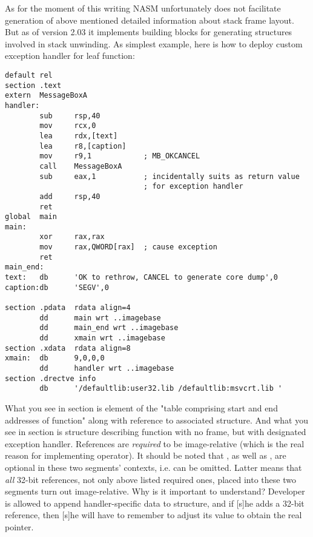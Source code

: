 As for the moment of this writing NASM unfortunately does not
facilitate generation of above mentioned detailed information about
stack frame layout. But as of version 2.03 it implements building
blocks for generating structures involved in stack unwinding. As
simplest example, here is how to deploy custom exception handler for
leaf function:

\begin{lstlisting}
default rel
section .text
extern  MessageBoxA
handler:
        sub     rsp,40
        mov     rcx,0
        lea     rdx,[text]
        lea     r8,[caption]
        mov     r9,1            ; MB_OKCANCEL
        call    MessageBoxA
        sub     eax,1           ; incidentally suits as return value
                                ; for exception handler
        add     rsp,40
        ret
global  main
main:
        xor     rax,rax
        mov     rax,QWORD[rax]  ; cause exception
        ret
main_end:
text:   db      'OK to rethrow, CANCEL to generate core dump',0
caption:db      'SEGV',0

section .pdata  rdata align=4
        dd      main wrt ..imagebase
        dd      main_end wrt ..imagebase
        dd      xmain wrt ..imagebase
section .xdata  rdata align=8
xmain:  db      9,0,0,0
        dd      handler wrt ..imagebase
section .drectve info
        db      '/defaultlib:user32.lib /defaultlib:msvcrt.lib '
\end{lstlisting}

What you see in  section is element of the "table comprising
start and end addresses of function" along with reference to associated
 structure. And what you see in  section is
 structure describing function with no frame, but with
designated exception handler. References are \emph{required} to be
image-relative (which is the real reason for implementing  operator). It should be noted that , as
well as , are optional in these two segments'
contexts, i.e. can be omitted. Latter means that \emph{all} 32-bit
references, not only above listed required ones, placed into these two
segments turn out image-relative. Why is it important to understand?
Developer is allowed to append handler-specific data to 
structure, and if [s]he adds a 32-bit reference, then [s]he will have
to remember to adjust its value to obtain the real pointer.

